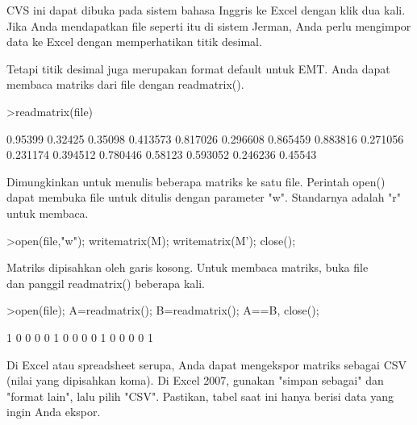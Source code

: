 \documentclass{article}
\begin{document}
\begin{eulernotebook}
\begin{eulercomment}
\begin{eulercomment}
\begin{euleroutput}
\end{euleroutput}
\begin{eulercomment}
CVS ini dapat dibuka pada sistem bahasa Inggris ke Excel dengan klik
dua kali. Jika Anda mendapatkan file seperti itu di sistem Jerman,
Anda perlu mengimpor data ke Excel dengan memperhatikan titik desimal.

Tetapi titik desimal juga merupakan format default untuk EMT. Anda
dapat membaca matriks dari file dengan readmatrix().
\end{eulercomment}
\begin{eulerprompt}
>readmatrix(file)
\end{eulerprompt}
\begin{euleroutput}
        0.95399       0.32425       0.35098      0.413573 
       0.817026      0.296608      0.865459      0.883816 
       0.271056      0.231174      0.394512      0.780446 
        0.58123      0.593052      0.246236       0.45543 
\end{euleroutput}
\begin{eulercomment}
Dimungkinkan untuk menulis beberapa matriks ke satu file. Perintah
open() dapat membuka file untuk ditulis dengan parameter "w".
Standarnya adalah "r" untuk membaca.
\end{eulercomment}
\begin{eulerprompt}
>open(file,"w"); writematrix(M); writematrix(M'); close();
\end{eulerprompt}
\begin{eulercomment}
Matriks dipisahkan oleh garis kosong. Untuk membaca matriks, buka file\\
dan panggil readmatrix() beberapa kali.
\end{eulercomment}
\begin{eulerprompt}
>open(file); A=readmatrix(); B=readmatrix(); A==B, close();
\end{eulerprompt}
\begin{euleroutput}
              1             0             0             0 
              0             1             0             0 
              0             0             1             0 
              0             0             0             1 
\end{euleroutput}
\begin{eulercomment}
Di Excel atau spreadsheet serupa, Anda dapat mengekspor matriks
sebagai CSV (nilai yang dipisahkan koma). Di Excel 2007, gunakan
"simpan sebagai" dan "format lain", lalu pilih "CSV". Pastikan, tabel
saat ini hanya berisi data yang ingin Anda ekspor.


\end{eulercomment}
\end{eulercomment}
\end{eulercomment}
\end{eulernotebook}
\end{document}
